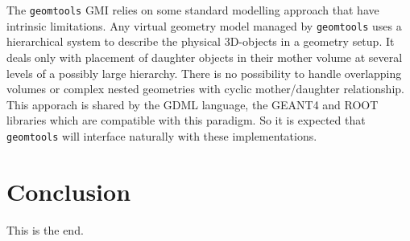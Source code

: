 \documentclass[a4paper,12pt]{article}
\newcommand{\basepath}{.}
\newcommand{\imagepath}{\basepath/images}
\newcommand{\pn}{\par\noindent}
\begin{document}
\pn  The  \texttt{geomtools} GMI  relies  on  some standard  modelling
approach that  have intrinsic limitations. Any  virtual geometry model
managed by  \texttt{geomtools} uses a hierarchical  system to describe
the  physical 3D-objects  in a  geometry  setup.  It  deals only  with
placement of daughter objects in their mother volume at several levels
of  a possibly  large hierarchy.  There  is no  possibility to  handle
overlapping   volumes  or  complex   nested  geometries   with  cyclic
mother/daughter  relationship. This  apporach  is shared  by the  GDML
language, the GEANT4 and ROOT libraries which are compatible with this
paradigm.  So  it is  expected that \texttt{geomtools}  will interface
naturally with these implementations.
\pagebreak



\clearpage


\clearpage

\section{Conclusion}



\pn This is the end.
\end{document}
